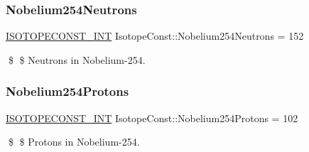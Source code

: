 \subsubsection{\texorpdfstring{Nobelium254\+Neutrons}{Nobelium254Neutrons}}
{\footnotesize\ttfamily \mbox{\hyperlink{group___isotope_const-_macros_ga5f18360b3e99483a35c32d789e62621c}{I\+S\+O\+T\+O\+P\+E\+C\+O\+N\+S\+T\+\_\+\+I\+NT}} Isotope\+Const\+::\+Nobelium254\+Neutrons = 152}

\$ \$ Neutrons in Nobelium-\/254. \mbox{\label{group___isotope_const-_nobelium-_no254_gad578a4c7fb42040a0d64aca4004113f8}} 
\subsubsection{\texorpdfstring{Nobelium254\+Protons}{Nobelium254Protons}}
{\footnotesize\ttfamily \mbox{\hyperlink{group___isotope_const-_macros_ga5f18360b3e99483a35c32d789e62621c}{I\+S\+O\+T\+O\+P\+E\+C\+O\+N\+S\+T\+\_\+\+I\+NT}} Isotope\+Const\+::\+Nobelium254\+Protons = 102}

\$ \$ Protons in Nobelium-\/254. 